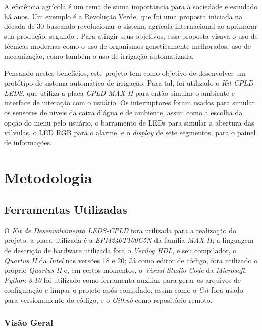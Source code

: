 \documentclass[
	article,			%
	11pt,				%
	oneside,			%
	a4paper,			%
	english,			%
	brazil,				%
	sumario=tradicional
	]{abntex2}
\begin{document}
A eficiência agrícola é um tema de suma importância para a sociedade e estudado há anos. Um exemplo é a Revolução Verde, que foi uma proposta iniciada na década de 30 buscando revolucionar o sistema agrícola internacional ao aprimorar sua produção, segundo \cite{zambenedetti_2021_revoluo}. 
Para atingir seus objetivos, essa proposta visava o uso de técnicas modernas como o uso de organismos geneticamente melhorados, uso de mecanização, como também o uso de irrigação automatizada.

Pensando nestes benefícios, este projeto tem como objetivo de desenvolver um protótipo de sistema automático de irrigação. Para tal, foi utilizado o \textit{Kit CPLD-LEDS}, que utiliza a placa \textit{CPLD MAX II} para então simular o ambiente e interface de interação com o usuário. 
Os interruptores foram usados para simular os sensores de níveis da caixa d’água e de ambiente, assim como a escolha da opção do menu pelo usuário, o barramento de LEDs para simular a abertura das válvulas, o LED RGB para o alarme, e o \textit{display} de sete segmentos, para o painel de informações.



\section{Metodologia}

\subsection{Ferramentas Utilizadas}

O \textit{Kit de Desenvolvimento LEDS-CPLD} fora utilizada para a realização do projeto, a placa utilizada é a \textit{EPM240T100C5N} da família \textit{MAX II}; a linguagem de descrição de hardware utilizada fora o \textit{Verilog HDL}, e seu compilador, o \textit{Quartus II} da \textit{Intel} nas versões 18 e 20; 
Já como editor de código, fora utilizado o próprio \textit{Quartus II} e, em certos momentos, o \textit{Visual Studio Code} da \textit{Microsoft}. 
\textit{Python 3.10} foi utilizado como ferramenta auxiliar para gerar os arquivos de configuração e limpar o projeto após compilado, assim como o \textit{Git} fora usado para versionamento do código, e o \textit{Github} como repositório remoto.

\subsubsection{Visão Geral}
\end{document}
